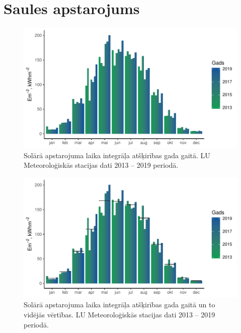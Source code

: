 \section{Saules apstarojums}
\begin{figure}[h]
    \centering
    \includegraphics[width=\linewidth]{figures/meteo/statsYears.pdf}
    \caption{Solārā apstarojuma laika integrāļa atšķirības gada gaitā. LU Meteoroloģiskās stacijas dati 2013 -- 2019 periodā.}
    \label{fig:metYears}
\end{figure}
\begin{figure}[h]
    \centering
    \includegraphics[width=\linewidth]{figures/meteo/meanYears.pdf}
    \caption{Solārā apstarojuma laika integrāļa atšķirības gada gaitā un to vidējās vērtības. LU Meteoroloģiskās stacijas dati 2013 -- 2019 periodā.}
    \label{fig:metYears_mean}
\end{figure}
